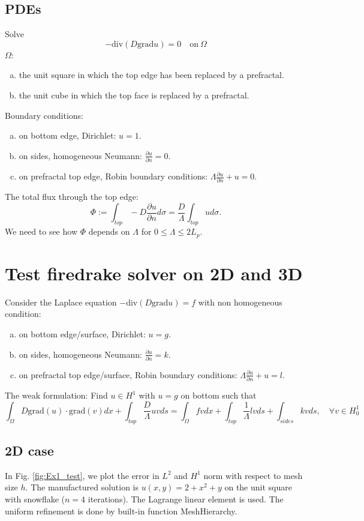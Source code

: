 \documentclass[12pt]{article}%
\theoremstyle{plain}
\numberwithin{equation}{section}
\begin{document}
\subsection{PDEs}
Solve 
\begin{equation}
-\text{div}(D\text{grad}u)=0\quad\text{on}\ \Omega
\label{eq1}
\end{equation}
$\Omega$:
\begin{enumerate}[(a)]
\item the unit square in which the top edge has been replaced by a prefractal.
\item the unit cube in which the top face is replaced by a prefractal.
\end{enumerate}
Boundary conditions: 
\begin{enumerate}[(a)]
\item on bottom edge, Dirichlet: $u=1$.
\item on sides, homogeneous Neumann: $\frac{\partial u}{\partial n}=0$.
\item on prefractal top edge, Robin boundary conditions: $\Lambda\frac{\partial u}{\partial n}+u=0$.
\end{enumerate}

The total flux through the top edge: 
$$
\Phi:=\int_{top}-D\frac{\partial u}{\partial n}d\sigma=\frac{D}{\Lambda}\int_{top}ud\sigma.
$$
We need to see how $\Phi$ depends on $\Lambda$ for $0\leq \Lambda\leq 2L_p$.

\section{Test firedrake solver on 2D and 3D}
Consider the Laplace equation $-\text{div}(D\text{grad}u)=f$ with non homogeneous condition: 
\begin{enumerate}[(a)]
\item on bottom edge/surface, Dirichlet: $u=g$.
\item on sides, homogeneous Neumann: $\frac{\partial u}{\partial n}=k$.
\item on prefractal top edge/surface, Robin boundary conditions: $\Lambda\frac{\partial u}{\partial n}+u=l$.
\end{enumerate}

The weak formulation: Find $u\in H^1$ with $u=g$ on bottom such that 
$$
\int_\Omega D\text{grad}(u)\cdot \text{grad}(v) dx+\int_{top}\frac{D}{\Lambda}u vds=\int_\Omega fv dx+\int_{top}\frac{1}{\Lambda} lvds+\int_{sides}kvds,\quad \forall v\in H^1_0
$$
\subsection{2D case}
In Fig. \ref{fig:Ex1_test}, we plot the error in $L^2$ and $H^1$ norm with respect to mesh size $h$. The manufactured solution is $u(x,y)= 2+x^2+y$ on the unit square with snowflake ($n=4$ iterations). The Lagrange linear element is used. The uniform refinement is done by built-in function MeshHierarchy.
\end{document}
